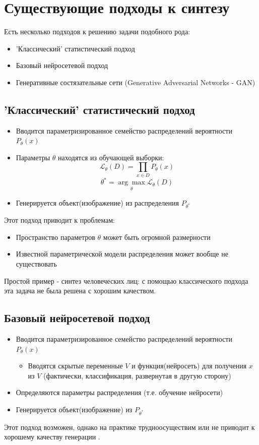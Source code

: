 \documentclass[a4paper]{article}
\begin{document}
	\section{Существующие подходы к синтезу}
		Есть несколько подходов к решению задачи подобного рода:
		\begin{itemize}
			\item 'Классический' статистический подход
			\item Базовый нейросетевой подход
			\item Генеративные состязательные сети (Generative Adversarial Networks - GAN)
		\end{itemize}
		\subsection{'Классический' статистический подход}
			\begin{itemize}
				\item Вводится параметризированное семейство распределений вероятности $P_{\theta}(x)$
				\item Параметры $\theta$ находятся из обучающей выборки:
				$$ \mathcal{L}_{\theta}(D) = \prod_{x \in D} P_{\theta}(x) $$
				$$ \theta^{*} = \underset{\theta}{\arg\max} \mathcal{L}_{\theta}(D)$$
				\item Генерируется объект(изображение) из распределения $ P_{\theta^{*}}$
			\end{itemize}
			Этот подход приводит к проблемам:
			\begin{itemize}
				\item Пространство параметров $\theta$ может быть огромной размерности
				\item Известной параметрической модели распределения может вообще не существовать
			\end{itemize}
			Простой пример - синтез человеческих лиц: с помощью классического подхода эта задача не была решена с хорошим качеством.
		\subsection{Базовый нейросетевой подход}
			\begin{itemize}
				\item Вводится параметризированное семейство распределений вероятности $P_{\theta}(x)$
				\begin{itemize}
					\item Вводятся скрытые переменные $V$ и функция(нейросеть) для получения $x$ из $V$ (фактически, классификация, развернутая в другую сторону)
				\end{itemize}
				\item Определяются параметры распределения (т.е. обучение нейросети)
				\item Генерируется объект(изображение) из $ P_{\theta^{*}}$
			\end{itemize}
			Этот подход возможен, однако на практике трудноосуществим или не приводит к хорошему качеству генерации \cite{GAN-2}.
\end{document}
